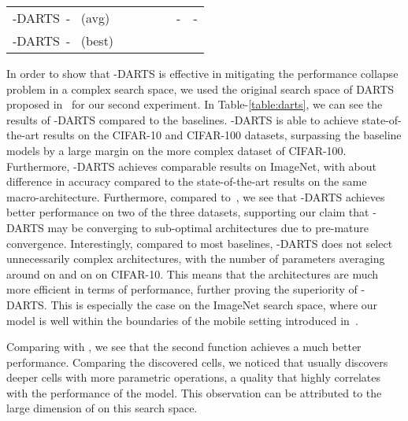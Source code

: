 \documentclass{article} \usepackage{fancyhdr, iclr2023_conference, times}
\newcommand{\mydarts}{-DARTS\xspace}
\begin{document}
\begin{table}[t]
\begin{center}
{\begin{tabular}{l l l l l l l}
\mydarts~-~ (avg) &  &  &  &  & - & -\\
\mydarts~-~ (best) &  &  &  &  &  & \\
\end{tabular}
}
\end{center}
\end{table}
\par In order to show that \mydarts is effective in mitigating the performance collapse problem in a complex search space, we used the original search space of DARTS proposed in~\citep{DBLP:conf/iclr/LiuSY19} for our second experiment. In Table-\ref{table:darts}, we can see the results of \mydarts compared to the baselines. \mydarts is able to achieve state-of-the-art results on the CIFAR-10 and CIFAR-100 datasets, surpassing the baseline models by a large margin on the more complex dataset of CIFAR-100. Furthermore, \mydarts achieves comparable results on ImageNet, with about  difference in accuracy compared to the state-of-the-art results on the same macro-architecture. Furthermore, compared to~\citep{DBLP:journals/corr/abs-2203-01665}, we see that \mydarts achieves better performance on two of the three datasets, supporting our claim that -DARTS may be converging to sub-optimal architectures due to pre-mature convergence. Interestingly, compared to most baselines, \mydarts does not select unnecessarily complex architectures, with the number of parameters averaging around  on  and  on  on CIFAR-10. This means that the architectures are much more efficient in terms of performance, further proving the superiority of \mydarts. This is especially the case on the ImageNet search space, where our model is well within the boundaries of the mobile setting introduced in~\citep{DBLP:conf/iclr/LiuSY19}. 
\par Comparing  with , we see that the second function achieves a much better performance. Comparing the discovered cells, we noticed that  usually discovers deeper cells with more parametric operations, a quality that highly correlates with the performance of the model. This observation can be attributed to the large dimension of  on this search space.
\end{document}
